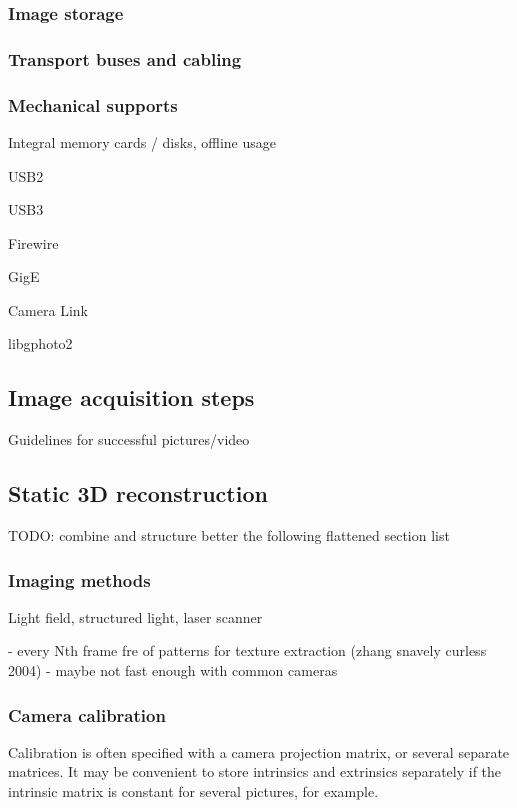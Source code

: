 \subsubsection{Image storage}

\subsubsection{Transport buses and cabling}

\subsubsection{Mechanical supports}

Integral memory cards / disks, offline usage

USB2

USB3

Firewire

GigE

Camera Link

libgphoto2

\subsection{Image acquisition steps}

Guidelines for successful pictures/video

\subsection{Static 3D reconstruction}

TODO: combine and structure better the following flattened section list

\subsubsection{Imaging methods}

Light field, structured light, laser scanner

- every Nth frame fre of patterns for texture extraction (zhang snavely curless 2004)
- maybe not fast enough with common cameras

\subsubsection{Camera calibration}

Calibration is often specified with a camera projection matrix, or several separate matrices. It may be convenient to store intrinsics and extrinsics separately if the intrinsic matrix is constant for several pictures, for example.


